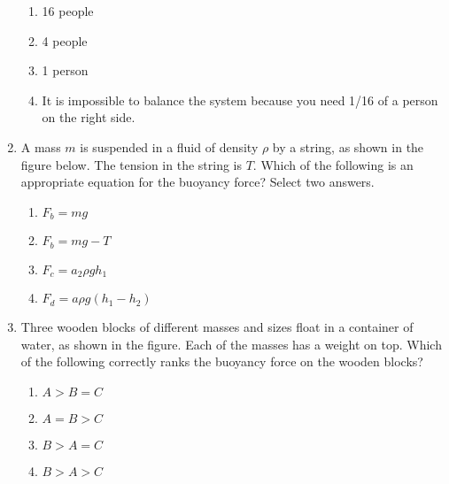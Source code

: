 \documentclass{../../../oss-apphys}
\begin{document}
\begin{multicols}{2}
\begin{enumerate}[leftmargin=18pt,start=3]
    \vspace{-.1in}
    \begin{enumerate}[noitemsep,topsep=0pt,leftmargin=18pt,label=(\Alph*)]
    \item \num{16} people
    \item \num{4} people
    \item \num{1} person
    \item It is impossible to balance the system because you need 1/16 of a
      person on the right side.
    \end{enumerate}

  \item A mass $m$ is suspended in a fluid of density $\rho$ by a string,
    as shown in the figure below. The tension in the string is $T$. Which of
    the following is an appropriate equation for the buoyancy force? Select
    two answers.
    \begin{center}
      \vspace{-.15in}
    \end{center}
    \begin{enumerate}[noitemsep,topsep=0pt,leftmargin=18pt,label=(\Alph*)]
    \item $F_b=mg$
    \item $F_b=mg-T$
    \item $F_c=a_2 \rho gh_1$
    \item $F_d=a\rho g(h_1-h_2)$
    \end{enumerate}
    
  \item Three wooden blocks of different masses and sizes float in a container
    of water, as shown in the figure. Each of the masses has a weight on top.
    Which of the following correctly ranks the buoyancy force on the wooden
    blocks?
    \begin{center}
      \vspace{-.15in}
    \end{center}
    \begin{enumerate}[noitemsep,topsep=0pt,leftmargin=18pt,label=(\Alph*)]
    \item $A > B = C$
    \item $A = B > C$
    \item $B > A = C$
    \item $B > A > C$
    \end{enumerate}
    

\end{enumerate}
\end{multicols}
\end{document}
